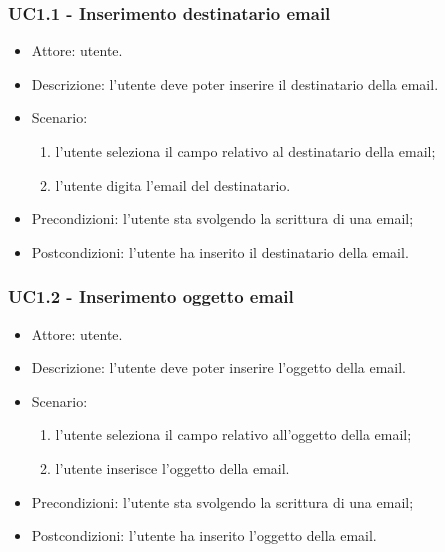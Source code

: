     \subsubsection{UC1.1 - Inserimento destinatario email}
    \begin{itemize}
        \item Attore: utente.
        \item Descrizione: l'utente deve poter inserire il destinatario della email.
        \item Scenario:
        \begin{enumerate}
        \item l'utente seleziona il campo relativo al destinatario della email;
        \item l'utente digita l'email del destinatario.
        \end{enumerate}
        \item Precondizioni: l'utente sta svolgendo la scrittura di una email;
        \item Postcondizioni: l'utente ha inserito il destinatario della email.
    \end{itemize}

    \subsubsection{UC1.2 - Inserimento oggetto email}
    \begin{itemize}
        \item Attore: utente.
        \item Descrizione: l'utente deve poter inserire l'oggetto della email.
        \item Scenario:
        \begin{enumerate}
        \item l'utente seleziona il campo relativo all'oggetto della email;
        \item l'utente inserisce l'oggetto della email.
        \end{enumerate}
        \item Precondizioni: l'utente sta svolgendo la scrittura di una email;
        \item Postcondizioni: l'utente ha inserito l'oggetto della email.
    \end{itemize}
    
